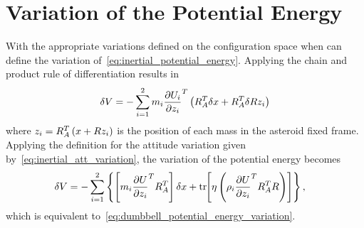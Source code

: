 \section{Variation of the Potential Energy}\label{sec:inertial_potential_energy_variation}
With the appropriate variations defined on the configuration space when can define the variation of~\cref{eq:inertial_potential_energy}.
Applying the chain and product rule of differentiation results in
\begin{align}
    \delta V = - \sum_{i=1}^{2} m_i \frac{\partial U_i}{\partial z_i}^T \left(  R_A^T \delta x + R_A^T \delta R z_i \right)
\end{align}
where \( z_i = R_A^T \left( x + R z_i \right) \) is the position of each mass in the asteroid fixed frame.
Applying the definition for the attitude variation given by~\cref{eq:inertial_att_variation}, the variation of the potential energy becomes
\begin{align*}
    \delta V &= - \sum_{i=1}^2 \left\{  \left[ m_i \frac{\partial U}{\partial z_i}^T R_A^T  \right] \delta x + \mathrm{tr}\negthickspace\left[  \eta \left(  \rho_i \frac{\partial U}{\partial z_i}^T R_A^T R  \right)  \right] \right\},
\end{align*}
which is equivalent to~\cref{eq:dumbbell_potential_energy_variation}.

